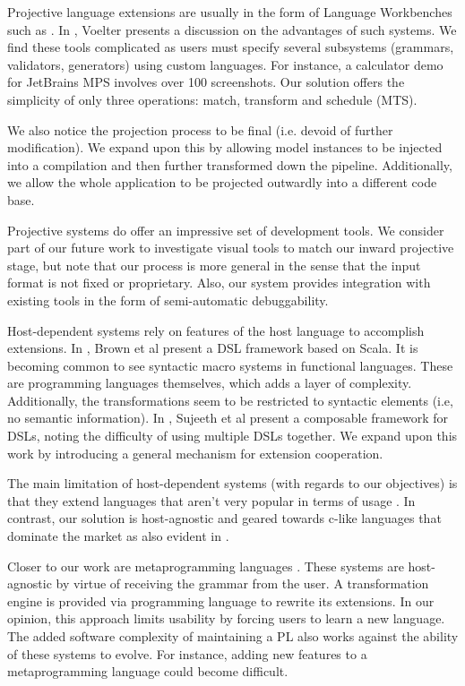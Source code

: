 \documentclass[conference]{IEEEtran}
\begin{document}
Projective language extensions are usually in the form of Language Workbenches such as \cite{Voelter, Spoofax}. In \cite{Voelter}, Voelter presents a discussion on the advantages of such systems. We find these tools complicated as users must specify several subsystems (grammars, validators, generators) using custom languages. For instance, a calculator demo \cite{Calculator} for JetBrains MPS involves over 100 screenshots. Our solution offers the simplicity of only three operations: match, transform and schedule (MTS).

We also notice the projection process to be final (i.e. devoid of further modification). We expand upon this by allowing model instances to be injected into a compilation and then further transformed down the pipeline. Additionally, we allow the whole application to be projected outwardly into a different code base.

Projective systems do offer an impressive set of development tools. We consider part of our future work to investigate visual tools to match our inward projective stage, but note that our process is more general in the sense that the input format is not fixed or proprietary. Also, our system provides integration with existing tools in the form of semi-automatic debuggability. 

Host-dependent systems rely on features of the host language to accomplish extensions. In \cite{Brown}, Brown et al present a DSL framework based on Scala. It is becoming common to see syntactic macro systems \cite{Racket} in functional languages. These are programming languages themselves, which adds a layer of complexity. Additionally, the transformations seem to be restricted to syntactic elements (i.e, no semantic information). In \cite{Sujeeth}, Sujeeth et al present a composable framework for DSLs, noting the difficulty of using multiple DSLs together. We expand upon this work by introducing a general mechanism for extension cooperation.

The main limitation of host-dependent systems (with regards to our objectives) is that they extend languages that aren't very popular in terms of usage \cite{Tiobe}. In contrast, our solution is host-agnostic and geared towards c-like languages that dominate the market as also evident in \cite{Tiobe}. 

Closer to our work are metaprogramming languages \cite{Stratego, Rascal}. These systems are host-agnostic by virtue of receiving the grammar from the user. A transformation engine is provided via programming language to rewrite its extensions. In our opinion, this approach limits usability by forcing users to learn a new language. The added software complexity of maintaining a PL also works against the ability of these systems to evolve. For instance, adding new features to a metaprogramming language could become difficult.
\end{document}
